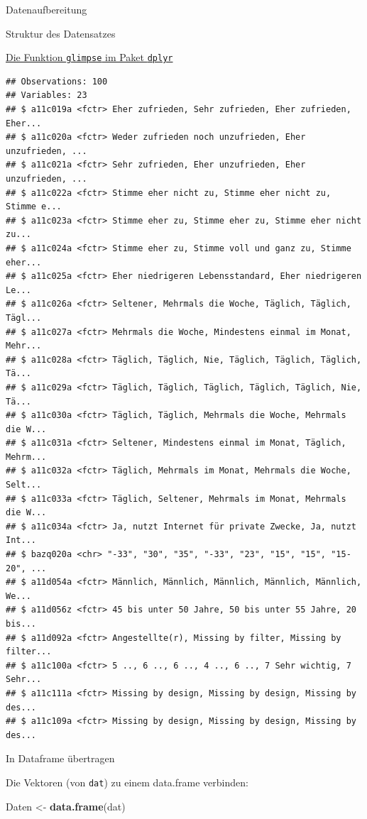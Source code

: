 \documentclass[ignorenonframetext,]{beamer}
\newenvironment{Shaded}{}{}
\newcommand{\KeywordTok}[1]{\textcolor[rgb]{0.00,0.44,0.13}{\textbf{{#1}}}}
\newcommand{\StringTok}[1]{\textcolor[rgb]{0.25,0.44,0.63}{{#1}}}
\newcommand{\NormalTok}[1]{{#1}}
\begin{document}
\begin{frame}[fragile]{Datenaufbereitung}
\begin{block}{Struktur des Datensatzes}
\begin{block}{\href{https://stats.stackexchange.com/questions/11551/is-there-a-good-browser-viewer-to-see-an-r-dataset-rda-file}{Die
Funktion \texttt{glimpse} im Paket \texttt{dplyr}}}
\begin{verbatim}
## Observations: 100
## Variables: 23
## $ a11c019a <fctr> Eher zufrieden, Sehr zufrieden, Eher zufrieden, Eher...
## $ a11c020a <fctr> Weder zufrieden noch unzufrieden, Eher unzufrieden, ...
## $ a11c021a <fctr> Sehr zufrieden, Eher unzufrieden, Eher unzufrieden, ...
## $ a11c022a <fctr> Stimme eher nicht zu, Stimme eher nicht zu, Stimme e...
## $ a11c023a <fctr> Stimme eher zu, Stimme eher zu, Stimme eher nicht zu...
## $ a11c024a <fctr> Stimme eher zu, Stimme voll und ganz zu, Stimme eher...
## $ a11c025a <fctr> Eher niedrigeren Lebensstandard, Eher niedrigeren Le...
## $ a11c026a <fctr> Seltener, Mehrmals die Woche, Täglich, Täglich, Tägl...
## $ a11c027a <fctr> Mehrmals die Woche, Mindestens einmal im Monat, Mehr...
## $ a11c028a <fctr> Täglich, Täglich, Nie, Täglich, Täglich, Täglich, Tä...
## $ a11c029a <fctr> Täglich, Täglich, Täglich, Täglich, Täglich, Nie, Tä...
## $ a11c030a <fctr> Täglich, Täglich, Mehrmals die Woche, Mehrmals die W...
## $ a11c031a <fctr> Seltener, Mindestens einmal im Monat, Täglich, Mehrm...
## $ a11c032a <fctr> Täglich, Mehrmals im Monat, Mehrmals die Woche, Selt...
## $ a11c033a <fctr> Täglich, Seltener, Mehrmals im Monat, Mehrmals die W...
## $ a11c034a <fctr> Ja, nutzt Internet für private Zwecke, Ja, nutzt Int...
## $ bazq020a <chr> "-33", "30", "35", "-33", "23", "15", "15", "15-20", ...
## $ a11d054a <fctr> Männlich, Männlich, Männlich, Männlich, Männlich, We...
## $ a11d056z <fctr> 45 bis unter 50 Jahre, 50 bis unter 55 Jahre, 20 bis...
## $ a11d092a <fctr> Angestellte(r), Missing by filter, Missing by filter...
## $ a11c100a <fctr> 5 .., 6 .., 6 .., 4 .., 6 .., 7 Sehr wichtig, 7 Sehr...
## $ a11c111a <fctr> Missing by design, Missing by design, Missing by des...
## $ a11c109a <fctr> Missing by design, Missing by design, Missing by des...
\end{verbatim}

\end{block}

\end{block}

\begin{block}{In Dataframe übertragen}

Die Vektoren (von \texttt{dat}) zu einem data.frame verbinden:

\begin{Shaded}
\begin{Highlighting}[]
\NormalTok{Daten <-}\StringTok{ }\KeywordTok{data.frame}\NormalTok{(dat)}
\end{Highlighting}
\end{Shaded}


\end{block}
\end{frame}
\end{document}
